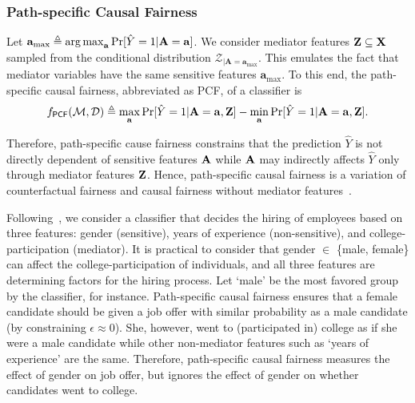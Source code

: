 \subsubsection{Path-specific Causal Fairness}
Let $ \mathbf{a}_{\max}  \triangleq \operatorname*{arg\,max}_{ \mathbf{a}} \Pr[\hat{Y} =1 |\mathbf{A}=  \mathbf{a}] $. We consider mediator features $ \mathbf{Z} \subseteq \mathbf{X} $ sampled from the conditional distribution $ {\mathcal{Z}_{|\mathbf{A} = \mathbf{a}_{\max}}} $. This emulates the fact that mediator variables have the same sensitive features $ \mathbf{a}_{\max} $.   To this end, the path-specific causal fairness, abbreviated as PCF, of a classifier is \[
 f_{\mathsf{PCF}}(\mathcal{M}, \mathcal{D}) \triangleq \max_{\mathbf{a}}\Pr[\hat{Y} = 1 | \mathbf{A} =  \mathbf{a}, \mathbf{Z}] - \min_{\mathbf{a}} \Pr[\hat{Y} = 1 | \mathbf{A} = \mathbf{a}, \mathbf{Z} ].
\]



Therefore, path-specific cause fairness constrains that the prediction $ \hat{Y} $ is not directly dependent of sensitive features $ \mathbf{A} $ while $ \mathbf{A} $ may indirectly affects $ \hat{Y} $ only through mediator features $ \mathbf{Z} $. Hence, path-specific causal fairness is a variation of counterfactual fairness and causal fairness without mediator features~\cite{bastani2019probabilistic}. 




\begin{example}
	Following~\cite{bastani2019probabilistic}, we consider a classifier that decides the hiring of employees based on three features: gender (sensitive), years of experience (non-sensitive), and college-participation (mediator). It is practical to consider that gender $ \in $ \{male, female\} can affect the college-participation of individuals, and all three features are determining factors for the hiring process. Let `male' be the most favored group by the classifier, for instance. Path-specific causal fairness ensures that a female candidate should be given a job offer with similar probability as a male candidate (by constraining $ \epsilon \approx 0 $). She,  however,  went to (participated in) college as if she were a male candidate while other non-mediator features such as  `years of experience' are the same.  Therefore, path-specific causal fairness measures the effect of gender on job offer, but ignores the effect of gender on whether candidates went to college.
\end{example}	



